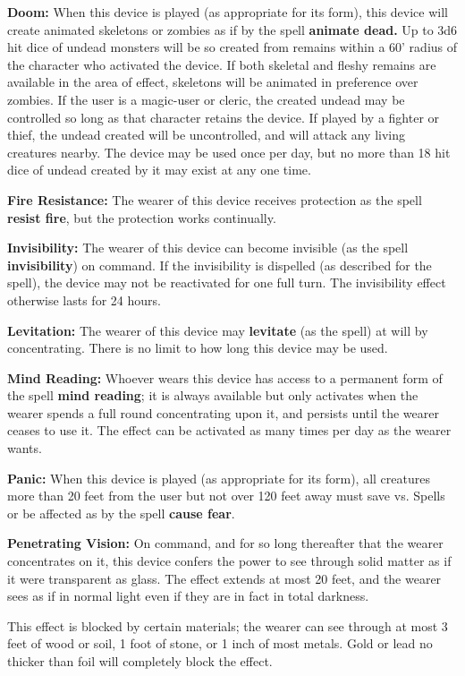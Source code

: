 \documentclass[a4paper,twoside,openany,10pt]{book}
\begin{document}
\begin{multicols}{2}
\textbf{Doom:} When this device is played (as appropriate for its form), this device will create animated skeletons or zombies as if by the spell \textbf{animate dead.} Up to 3d6 hit dice of undead monsters will be so created from remains within a 60' radius of the character who activated the device. If both skeletal and fleshy remains are available in the area of effect, skeletons will be animated in preference over zombies. If the user is a magic-user or cleric, the created undead may be controlled so long as that character retains the device. If played by a fighter or thief, the undead created will be uncontrolled, and will attack any living creatures nearby. The device may be used once per day, but no more than 18 hit dice of undead created by it may exist at any one time.

\textbf{Fire Resistance:} The wearer of this device receives protection as the spell \textbf{resist fire}, but the protection works continually.

\textbf{Invisibility:} The wearer of this device can become invisible (as the spell \textbf{invisibility}) on command. If the invisibility is dispelled (as described for the spell), the device may not be reactivated for one full turn. The invisibility effect otherwise lasts for 24 hours.

\textbf{Levitation:} The wearer of this device may \textbf{levitate} (as the spell) at will by concentrating. There is no limit to how long this device may be used.

\textbf{Mind Reading:} Whoever wears this device has access to a permanent form of the spell \textbf{mind reading}; it is always available but only activates when the wearer spends a full round concentrating upon it, and persists until the wearer ceases to use it. The effect can be activated as many times per day as the wearer wants.

\textbf{Panic:} When this device is played (as appropriate for its form), all creatures more than 20 feet from the user but not over 120 feet away must save vs. Spells or be affected as by the spell \textbf{cause fear}.

\textbf{Penetrating Vision:} On command, and for so long thereafter that the wearer concentrates on it, this device confers the power to see through solid matter as if it were transparent as glass. The effect extends at most 20 feet, and the wearer sees as if in normal light even if they are in fact in total darkness.

This effect is blocked by certain materials; the wearer can see through at most 3 feet of wood or soil, 1 foot of stone, or 1 inch of most metals. Gold or lead no thicker than foil will completely block the effect.


\end{multicols}
\end{document}
